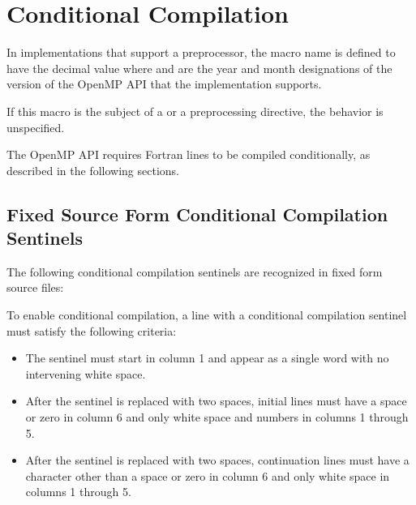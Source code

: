 \section{Conditional Compilation}
\label{sec:Conditional Compilation}
In implementations that support a preprocessor, the  macro name is defined to
have the decimal value  where  and  are the year and month designations
of the version of the OpenMP API that the implementation supports.

If this macro is the subject of a  or a  preprocessing directive, the
behavior is unspecified.

\begin{fortranspecific}
The OpenMP API requires Fortran lines to be compiled conditionally, as described in
the following sections.




\subsection{Fixed Source Form Conditional Compilation Sentinels}
\label{subsec:Fixed Source Form Conditional Compilation Sentinels}
The following conditional compilation sentinels are recognized in fixed form source
files:


To enable conditional compilation, a line with a conditional compilation sentinel must
satisfy the following criteria:

\begin{itemize}
\item The sentinel must start in column 1 and appear as a single word with no intervening
white space.

\item After the sentinel is replaced with two spaces, initial lines must have a space or zero
in column 6 and only white space and numbers in columns 1 through 5.

\item After the sentinel is replaced with two spaces, continuation lines must have a
character other than a space or zero in column 6 and only white space in columns 1
through 5.
\end{itemize}


\end{fortranspecific}

